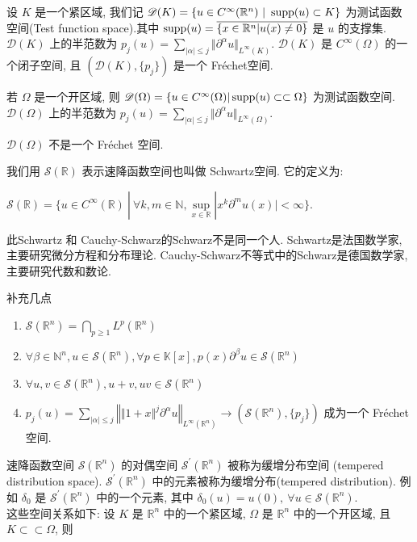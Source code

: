 \documentclass[11pt]{ctexart}[UTF8]
\begin{document}
设 $K$ 是一个紧区域, 我们记 $\mathscr{D}(K) = \{ u \in C^{\infty}(\mathbb{R}^{n})\ |\ \operatorname{supp}(u) \subset K \}$ 为测试函数空间(Test function space).其中 $\operatorname{supp}(u) = \overline{\{ x \in \mathbb{R}^{n} | u(x) \neq 0 \}}$ 是 $u$ 的支撑集. 
$\mathscr{D}(K)$ 上的半范数为 $p_{j}(u) = \sum\limits_{|\alpha|\leq j} \Vert \partial^{\alpha} u \Vert_{L^{\infty}(K)}$.
$\mathscr{D}(K)$ 是 $C^{\infty}(\Omega)$ 的一个闭子空间, 且 $(\mathscr{D}(K), \{ p_{j} \})$ 是一个 Fr\'echet空间. \par
若 $\Omega$ 是一个开区域, 则 $\mathscr{D}(\Omega) = \{ u \in C^{\infty}(\Omega) | \operatorname{supp}(u) \subset\subset \Omega \}$ 为测试函数空间. $\mathscr{D}(\Omega)$ 上的半范数为 
$p_{j}(u) = \sum\limits_{|\alpha|\leq j} \Vert \partial^{\alpha} u \Vert_{L^{\infty}(\Omega)}$.
\begin{remark}
    $\mathscr{D}(\Omega)$ 不是一个 Fr\'echet 空间.
\end{remark}

我们用 $\mathscr{S}(\mathbb{R})$ 表示速降函数空间也叫做 Schwartz空间. 它的定义为:
\begin{definition}[Schwartz空间]
    $\mathscr{S}(\mathbb{R}) = \{ u \in C^{\infty}(\mathbb{R})\ |\ \forall k, m \in \mathbb{N}, \sup\limits_{x \in \mathbb{R}} |x^k \partial^m u(x)| < \infty \}$.
\end{definition}
\begin{remark}
    此Schwartz 和 Cauchy-Schwarz的Schwarz不是同一个人. Schwartz是法国数学家, 主要研究微分方程和分布理论. Cauchy-Schwarz不等式中的Schwarz是德国数学家, 主要研究代数和数论.
\end{remark}
补充几点
\begin{enumerate}
    \item $\mathscr{S}(\mathbb{R}^{n}) = \bigcap\limits_{p\geq 1} L^p(\mathbb{R}^{n})$
    \item $\forall \beta\in \mathbb{N}^{n}, u \in \mathscr{S}(\mathbb{R}^{n}), \forall p \in \mathbb{K}[x], p(x)\partial^{\beta} u \in \mathscr{S}(\mathbb{R}^{n})$
    \item $\forall u,v \in \mathscr{S}(\mathbb{R}^{n}), u+v,uv \in \mathscr{S}(\mathbb{R}^{n})$
    \item $p_{j}(u) = \sum\limits_{|\alpha|\leq j} \left\Vert\Vert 1+x \Vert^{j} \partial^{\alpha} u \right\Vert_{L^{\infty}(\mathbb{R}^{n})} \longrightarrow (\mathscr{S}(\mathbb{R}^{n}), \{ p_{j} \})$ 成为一个 Fr\'echet空间.  
\end{enumerate}
速降函数空间 $\mathscr{S}(\mathbb{R}^{n})$ 的对偶空间 $\mathscr{S}^{\prime}(\mathbb{R}^{n})$ 被称为缓增分布空间 (tempered distribution space). 
$\mathscr{S}^{\prime}(\mathbb{R}^{n})$ 中的元素被称为缓增分布(tempered distribution). 
例如 $\delta_{0}$ 是 $\mathscr{S}^{\prime}(\mathbb{R}^{n})$ 中的一个元素, 其中 $\delta_{0}(u) = u(0),\ \forall u \in \mathscr{S}(\mathbb{R}^{n})$.\\
这些空间关系如下: 设 $K$ 是 $\mathbb{R}^{n}$ 中的一个紧区域, $\Omega$ 是 $\mathbb{R}^{n}$ 中的一个开区域, 且 $K \subset\subset \Omega$, 则
\end{document}
